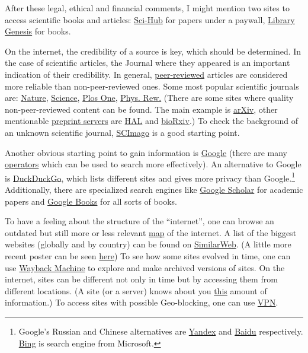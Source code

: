 \documentclass{article}
\begin{document}
After these legal, ethical and financial comments, I might mention two sites to access scientific books and articles: \href{https://en.wikipedia.org/wiki/Sci-Hub}{Sci-Hub} for papers under a paywall, \href{https://en.wikipedia.org/wiki/Library_Genesis}{Library Genesis} for books.

On the internet, the credibility of a source is key, which should be determined. In the case of scientific articles, the Journal where they appeared is an important indication of their credibility. In general, \href{https://en.wikipedia.org/wiki/Peer_review}{peer-reviewed} articles are considered more reliable than non-peer-reviewed ones. Some most popular scientific journals are: \href{https://www.nature.com/}{Nature}, \href{https://www.sciencemag.org/}{Science}, \href{https://journals.plos.org/plosone/}{Plos One}, \href{https://journals.aps.org/}{Phys. Rew.} (There are some sites where quality non-peer-reviewed content can be found. The main example is \href{https://arxiv.org/}{arXiv}, other mentionable \href{https://en.wikipedia.org/wiki/List_of_preprint_repositories}{preprint servers} are \href{https://hal.archives-ouvertes.fr/}{HAL} and \href{https://www.biorxiv.org/}{bioRxiv}.) To check the background of an unknown scientific journal, \href{https://www.scimagojr.com/}{SCImago} is a good starting point.

Another obvious starting point to gain information is \href{https://www.google.com/}{Google} (there are many \href{https://ahrefs.com/blog/google-advanced-search-operators/}{operators} which can be used to search more effectively).
An alternative to Google is \href{https://duckduckgo.com/}{DuckDuckGo}, which lists different sites and gives more privacy than Google.\footnote{Google's Russian and Chinese alternatives are \href{https://yandex.com/}{Yandex} and \href{https://www.baidu.com/}{Baidu} respectively. \href{https://www.bing.com/}{Bing} is search engine from Microsoft.}
Additionally, there are specialized search engines like \href{https://scholar.google.com/}{Google Scholar} for academic papers and \href{https://books.google.co.uk/}{Google Books} for all sorts of books.

To have a feeling about the structure of the ``internet'', one can browse an outdated but still more or less relevant \href{https://web.archive.org/web/20230221000817/http://internet-map.net/}{map} of the internet. A list of the biggest websites (globally and by country) can be found on \href{https://www.similarweb.com/}{SimilarWeb}. (A little more recent poster can be seen \href{https://www.visualcapitalist.com/wp-content/uploads/2019/08/top-100-websites-ranking.html}{here})
To see how some sites evolved in time, one can use \href{https://archive.org/web/}{Wayback Machine} to explore and make archived versions of sites. 
On the internet, sites can be different not only in time but by accessing them from different locations. (A site (or a server) knows about you \href{https://whatismyipaddress.com/}{this} amount of information.) To access sites with possible Geo-blocking, one can use \href{https://www.howtogeek.com/133680/htg-explains-what-is-a-vpn/}{VPN}.
\end{document}
